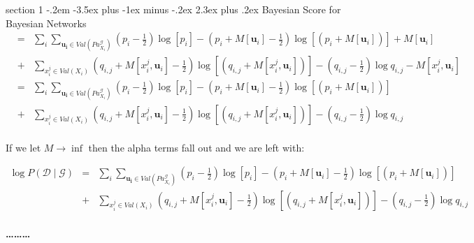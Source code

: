 \documentclass[12pt]{article}
\makeatletter
\newenvironment{problem}{\@startsection
       {section}
       {1}
       {-.2em}
       {-3.5ex plus -1ex minus -.2ex}
       {2.3ex plus .2ex}
       {\pagebreak[3]%
       \large\bf\noindent{Problem }
       }
       }
       {%
       \begin{center}\large\bf \ldots\ldots\ldots\end{center}}
\makeatother
\begin{document}
\begin{problem}{Bayesian Score for Bayesian Networks}
\begin{eqnarray*}
& = & 
	\sum_{i} \sum_{\mathbf{u_{i}} \in Val(Pa^{\mathcal{G}}_{X_{i}})} 
	 (p_{i}-\frac{1}{2}) \log [ p_{i} ] 
	-(p_{i} + M[ \mathbf{u}_{i}] - \frac{1}{2}) \log [(p_{i} + M[ \mathbf{u}_{i}]) ]
	+ M[ \mathbf{u}_{i}]\\
	&+ &\sum_{x_{i}^{j} \in Val(X_{i})} 
	(q_{i,j}  + M[ x_{i}^{j},\mathbf{u}_{i}] -\frac{1}{2}) \log [(q_{i,j}  + M[ x_{i}^{j},\mathbf{u}_{i}])] 
	-(q_{i,j} -\frac{1}{2}) \log q_{i,j}   
	-M[ x_{i}^{j},\mathbf{u}_{i}]\\	
& = & 
	\sum_{i} \sum_{\mathbf{u_{i}} \in Val(Pa^{\mathcal{G}}_{X_{i}})} 
	 (p_{i}-\frac{1}{2}) \log [ p_{i} ] 
	-(p_{i} + M[ \mathbf{u}_{i}] - \frac{1}{2}) \log [(p_{i} + M[ \mathbf{u}_{i}]) ]\\
	&+ &\sum_{x_{i}^{j} \in Val(X_{i})} 
	(q_{i,j}  + M[ x_{i}^{j},\mathbf{u}_{i}] -\frac{1}{2}) \log [(q_{i,j}  + M[ x_{i}^{j},\mathbf{u}_{i}])] 
	-(q_{i,j} -\frac{1}{2}) \log q_{i,j}  \\
\end{eqnarray*}

If we let $ M \rightarrow \inf$ then the alpha terms fall out and we are left with:

\begin{eqnarray*}
\log P( \mathcal{D} \mid \mathcal{G}) & = & 
	\sum_{i} \sum_{\mathbf{u_{i}} \in Val(Pa^{\mathcal{G}}_{X_{i}})} 
	 (p_{i}-\frac{1}{2}) \log [ p_{i} ] 
	-(p_{i} + M[ \mathbf{u}_{i}] - \frac{1}{2}) \log [(p_{i} + M[ \mathbf{u}_{i}]) ]\\
	&+ &\sum_{x_{i}^{j} \in Val(X_{i})} 
	(q_{i,j}  + M[ x_{i}^{j},\mathbf{u}_{i}] -\frac{1}{2}) \log [(q_{i,j}  + M[ x_{i}^{j},\mathbf{u}_{i}])] 
	-(q_{i,j} -\frac{1}{2}) \log q_{i,j}  \\
\end{eqnarray*}

\end{problem}{}
\end{document}
